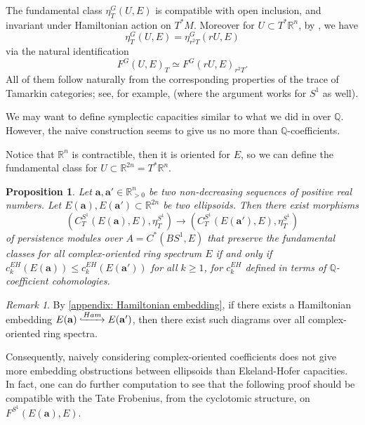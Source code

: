 \documentclass[11pt]{amsart}
\numberwithin{equation}{section}
\theoremstyle{plain}
\newtheorem{Prop}[prop]{Proposition}
\theoremstyle{definition}
\theoremstyle{remark}
\newtheorem{RMK}[rmk]{Remark}
\newcommand{\bQ} { {\mathbb{Q}}}
\newcommand{\bR} { {\mathbb{R}}}
\begin{document}
The fundamental class $\eta^G_T(U,E)$ is compatible with open inclusion, and invariant under Hamiltonian action on $T^*M$. Moreover for $U\subset T^*\bR^n$, by \cite[Corollary 2.6]{Capacities2021}, we have 
\[\eta^G_T(U,E)=\eta^G_{r^2T}(rU,E)\]
via the natural identification \[F^G(U,E)_{T}\simeq F^G(rU,E)_{r^2T}.\]
All of them follow naturally from the corresponding properties of the trace of Tamarkin categories; see, for example, \cite[Section 2.4]{Capacities2021} (where the argument works for $S^1$ as well).

We may want to define symplectic capacities similar to what we did in \cite{Capacities2021,CyclicZHANG} over $\bQ$. However, the naive construction seems to give us no more than $\bQ$-coefficients. 

Notice that $\bR^n$ is contractible, then it is oriented for $E$, so we can define the fundamental class for $U\subset \bR^{2n}=T^*\bR^n$.
\begin{Prop}\label{prop: ellpsoid embedding from complex-oriented ring spectrum}Let $\mathbf{a},\mathbf{a'}\in \bR^n_{>0}$ be two non-decreasing sequences of positive real numbers. Let $E(\mathbf{a}),E(\mathbf{a'}) \subset \bR^{2n}$ be two ellipsoids. Then there exist morphisms
\[ 
({C_T^{S^1}(E(\mathbf{a}),E)},\eta_T^{S^1}) \to ({C_T^{S^1}(E(\mathbf{a'}),E)},\eta_T^{S^1})\]
of persistence modules over $A=C^*(BS^1,E)$ that preserve the fundamental classes  for all complex-oriented ring spectrum $E$ if and only if $c_k^{EH}(E(\mathbf{a}))\leq c_k^{EH}(E(\mathbf{a'}))$ for all $k\geq 1$, for $c_k^{EH}$ defined in terms of $\bQ$-coefficient cohomologies. 
\end{Prop}\begin{RMK}By \autoref{appendix: Hamiltonian embedding}, if there exists a Hamiltonian embedding $E(\mathbf{a})\lhook\joinrel\xrightarrow{Ham} E(\mathbf{a'})$, then there exist such diagrams over all complex-oriented ring spectra. 

Consequently, naively considering complex-oriented coefficients does not give more embedding obstructions between ellipsoids than Ekeland-Hofer capacities. In fact, one can do further computation to see that the following proof should be compatible with the Tate Frobenius, from the cyclotomic structure, on $F^{S^1}(E(\mathbf{a}),E) $.
\end{RMK}
\end{document}
